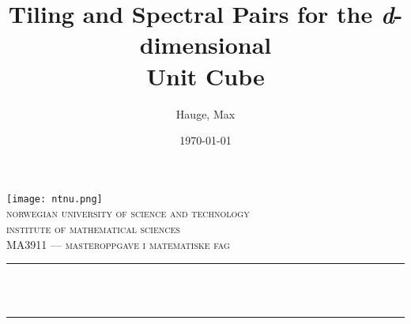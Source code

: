 
\begin{titlepage}
	\title{\textsf{Tiling and Spectral Pairs for the \emph{d}-dimensional\\ Unit Cube}}  %
	\author{Hauge, Max}
	\date{\today}

	\makeatletter
	\let\thetitle\@title
	\let\theauthor\@author
	\let\thedate\@date
	\makeatother


	\centering
    \vspace*{0.5 cm}
    \texttt{[image: ntnu.png]}\\[1.0 cm]
    
	\textsc{\LARGE \textsf{norwegian university of science and technology}}\\[1.0 cm]  %
    
	\textsc{\Large \textsf{institute of mathematical sciences}}\\[0.5 cm]  %
	
	\textsc{\large \textsf{MA3911 — masteroppgave i matematiske fag}}\\[0.5 cm]  %
	
	\rule{\linewidth}{0.2 mm} \\[0.4 cm]
	{ \LARGE \textbf{\uppercase{\thetitle}}}\\
	\rule{\linewidth}{0.2 mm} \\[1.0 cm]%
	

\end{titlepage}
